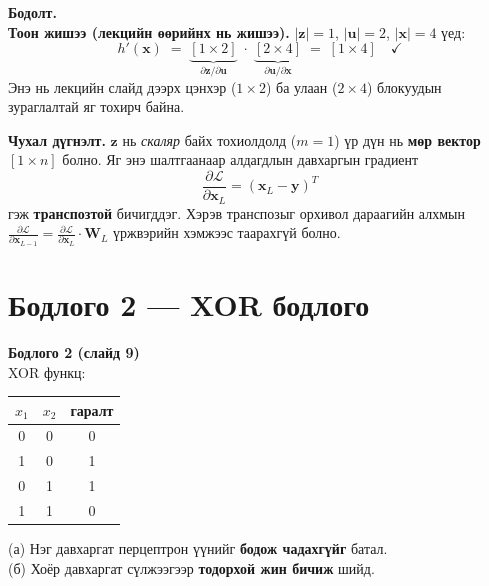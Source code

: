 \documentclass[11pt]{article}
\newenvironment{problem}[2][Бодлого]
    { \begin{mdframed}[backgroundcolor=gray!20] \textbf{#1 #2} \\}
    { \end{mdframed}}
\newenvironment{solution}[1][\textbf{Бодолт.}]
    { \noindent #1 \smallskip \\ }
    { \medskip }
\newcommand{\dL}[1]{\frac{\partial \mathcal{L}}{\partial #1}}
\begin{document}
\begin{solution}
\medskip
\textbf{Тоон жишээ (лекцийн өөрийнх нь жишээ).}
$|\mathbf{z}| = 1$, $|\mathbf{u}| = 2$, $|\mathbf{x}| = 4$ үед:
\[
h'(\mathbf{x}) \;=\; \underbrace{[1 \times 2]}_{\partial \mathbf{z}/\partial \mathbf{u}}
\;\cdot\; \underbrace{[2 \times 4]}_{\partial \mathbf{u}/\partial \mathbf{x}}
\;=\; [1 \times 4] \quad \checkmark
\]
Энэ нь лекцийн слайд дээрх цэнхэр ($1\times2$) ба улаан ($2\times4$) блокуудын зураглалтай
яг тохирч байна.

\medskip
\begin{mdframed}[backgroundcolor=yellow!12]
\textbf{Чухал дүгнэлт.} $\mathbf{z}$ нь \emph{скаляр} байх тохиолдолд ($m=1$) үр дүн нь
\textbf{мөр вектор} $[1 \times n]$ болно. Яг энэ шалтгаанаар алдагдлын давхаргын градиент
\[
\dL{\mathbf{x}_L} = (\mathbf{x}_L - \mathbf{y})^{T}
\]
гэж \textbf{транспозтой} бичигддэг. Хэрэв транспозыг орхивол дараагийн алхмын
$\dL{\mathbf{x}_{L-1}} = \dL{\mathbf{x}_L}\cdot \mathbf{W}_L$ үржвэрийн хэмжээс
таарахгүй болно.
\end{mdframed}
\end{solution}

\section{Бодлого 2 — XOR бодлого}

\begin{problem}{2 (слайд 9)}
XOR функц:
\begin{center}
\begin{tabular}{ccc}
\toprule
$x_1$ & $x_2$ & гаралт \\
\midrule
0 & 0 & 0 \\
1 & 0 & 1 \\
0 & 1 & 1 \\
1 & 1 & 0 \\
\bottomrule
\end{tabular}
\end{center}
(а) Нэг давхаргат перцептрон үүнийг \textbf{бодож чадахгүйг} батал. \\
(б) Хоёр давхаргат сүлжээгээр \textbf{тодорхой жин бичиж} шийд.
\end{problem}
\end{document}
